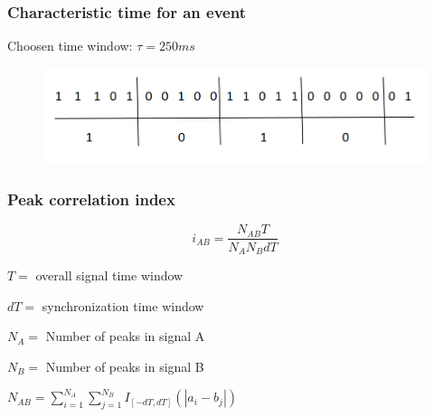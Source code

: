 \documentclass{beamer}
\begin{document}
\begin{frame}
\frametitle{Characteristic time for an event}

Choosen time window: $ \tau = 250  ms$ \vspace{1.4 cm}

\begin{figure}[H]
	\begin{center}
		\hspace*{-1.3cm}
		\includegraphics[scale=.45]{intervals.png} 
	\end{center}  
	
	
\end{figure}

\end{frame}

\begin{frame}
\frametitle{Peak correlation index}

$$ i_{AB} = \frac{N_{AB} T}{N_A N_B dT} $$ \vspace{0.5 cm}


$T = $ overall signal time window \\ \vspace{0.5 cm}

$dT = $ synchronization time window \\ \vspace{0.5 cm}

$N_A = $ Number of peaks in signal A \\ \vspace{0.5 cm}

$N_B = $ Number of peaks in signal B \\ \vspace{0.5 cm}



$N_{AB} = \sum_{i=1}^{N_A} \sum_{j=1}^{N_B} I_{[-dT,dT]}(|a_i - b_j|) $

\end{frame}
\end{document}
